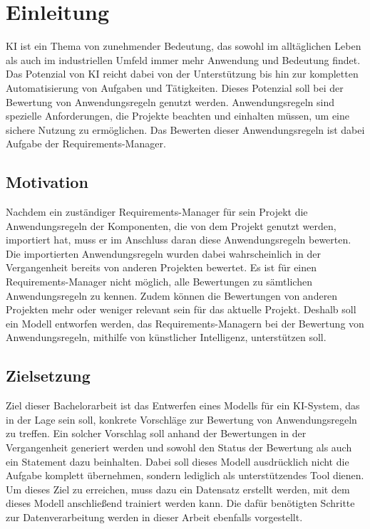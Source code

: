 \chapter{Einleitung}
\label{chap:einleitung}
\ac{KI} ist ein Thema von zunehmender Bedeutung, das sowohl im alltäglichen Leben als auch im industriellen Umfeld immer mehr Anwendung und Bedeutung findet. Das Potenzial von \ac{KI}
reicht dabei von der Unterstützung bis hin zur kompletten Automatisierung von Aufgaben und Tätigkeiten. Dieses Potenzial soll bei der Bewertung von Anwendungsregeln genutzt werden.
Anwendungsregeln sind spezielle Anforderungen, die Projekte beachten und einhalten müssen, um eine sichere Nutzung zu ermöglichen.
Das Bewerten dieser Anwendungsregeln ist dabei Aufgabe der Requirements-Manager.  

\section{Motivation}
\label{chap:Motivation}
Nachdem ein zuständiger Requirements-Manager für sein Projekt die Anwendungsregeln der Komponenten, die von dem Projekt genutzt werden, importiert hat, muss er im Anschluss daran
diese Anwendungsregeln bewerten. Die importierten Anwendungsregeln wurden dabei wahrscheinlich in der Vergangenheit bereits von anderen Projekten bewertet. 
Es ist für einen Requirements-Manager nicht möglich, alle Bewertungen zu sämtlichen Anwendungsregeln zu kennen. Zudem können die Bewertungen von anderen Projekten mehr oder weniger relevant 
sein für das aktuelle Projekt. Deshalb soll ein Modell entworfen werden, das Requirements-Managern bei der Bewertung von Anwendungsregeln, mithilfe von künstlicher Intelligenz, unterstützen soll.

\section{Zielsetzung}
\label{chap:Zielsetzung}
Ziel dieser Bachelorarbeit ist das Entwerfen eines Modells für ein \ac{KI}-System, das in der Lage sein soll, konkrete Vorschläge zur Bewertung von Anwendungsregeln zu treffen.
Ein solcher Vorschlag soll anhand der Bewertungen in der Vergangenheit generiert werden und sowohl den Status der Bewertung als auch ein Statement dazu beinhalten.
Dabei soll dieses Modell ausdrücklich nicht die Aufgabe komplett übernehmen, sondern lediglich als unterstützendes Tool dienen. 
Um dieses Ziel zu erreichen, muss dazu ein Datensatz erstellt werden, mit dem dieses Modell anschließend trainiert werden kann. Die dafür benötigten Schritte zur 
Datenverarbeitung werden in dieser Arbeit ebenfalls vorgestellt. 

